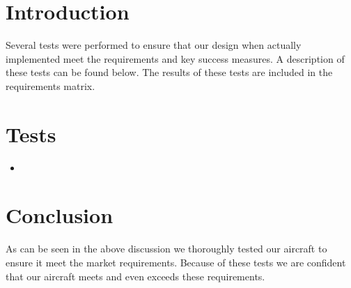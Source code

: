\documentclass[]{auvsi_doc}
\begin{document}
\begin{AUVSITitlePage}
\begin{artifacttable}
\end{artifacttable}
\end{AUVSITitlePage}

\section{Introduction}
Several tests were performed to ensure that our design when actually implemented meet the requirements and key success measures. A description of these tests can be found below. The results of these tests are included in the requirements matrix.

\section{Tests}
\begin{itemize}
	\item 
\end{itemize}

\section{Conclusion}
As can be seen in the above discussion we thoroughly tested our aircraft to ensure it meet the market requirements. Because of these tests we are confident that our aircraft meets and even exceeds these requirements.
\end{document}
